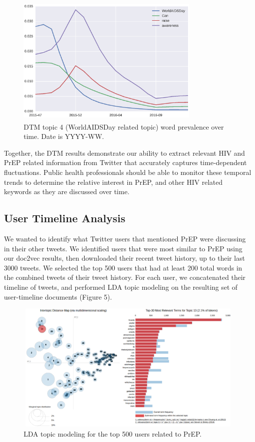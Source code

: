 \documentclass{sig-alternate-05-2015}
\begin{document}
\begin{figure}
\centering
\includegraphics[height=2.5in, width=3.5in]{DTMfig2}
\caption{DTM topic 4 (WorldAIDSDay related topic) word prevalence over time. Date is YYYY-WW.}
\end{figure}

Together, the DTM results demonstrate our ability to extract relevant HIV and PrEP related information from Twitter that accurately captures time-dependent fluctuations. Public health professionals should be able to monitor these temporal trends to determine the relative interest in PrEP, and other HIV related keywords as they are discussed over time.

\subsection{User Timeline Analysis}

We wanted to identify what Twitter users that mentioned PrEP were discussing in their other tweets. We identified users that were most similar to PrEP using our doc2vec results, then downloaded their recent tweet history, up to their last 3000 tweets. We selected the top 500 users that had at least 200 total words in the combined tweets of their tweet history. For each user, we concatenated their timeline of tweets, and performed LDA topic modeling on the resulting set of user-timeline documents (Figure 5).

\begin{figure}
\centering
\includegraphics[height=2.5in, width=5in]{LDA_user_timelines}
\caption{LDA topic modeling for the top 500 users related to PrEP.}
\end{figure}
\end{document}
